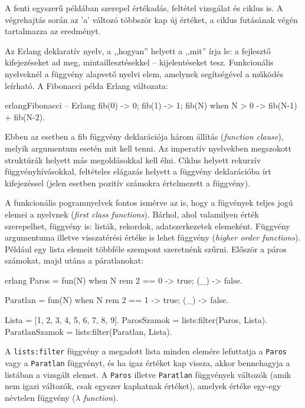 \documentclass[12pt, a4paper, oneside]{book}
\begin{document}
A fenti egyszerű példában szerepel értékadás, feltétel vizsgálat és ciklus is.
A végrehajtás során az 'a' változó többször kap új értéket, a ciklus futásának
végén tartalmazza az eredményt.

Az Erlang deklaratív nyelv, a ,,hogyan'' helyett a ,,mit'' írja le: a fejlesztő
kifejezéseket ad meg, mintaillesztésekkel -- kijelentéseket tesz. Funkcionális
nyelveknél a függvény alapvető nyelvi elem, amelynek segítségével a működés
leírható. A Fibonacci példa Erlang változata:

\begin{code}{erlang}{Fibonacci -- Erlang}
fib(0) -> 0; 
fib(1) -> 1; 
fib(N) when N > 0 -> fib(N-1) + fib(N-2).  
\end{code} 

Ebben az esetben a fib függvény deklarációja három állítás
(\emph{function clause}), melyik argumentum esetén mit kell tenni. Az imperatív
nyelvekben megszokott struktúrák helyett más megoldásokkal kell élni. Ciklus
helyett rekurzív függvényhívásokkal, feltételes elágazás helyett a függvény
deklarációba írt kifejezéssel (jelen esetben pozitív számokra értelmezett a
függvény).

A funkcionális pogramnyelvek fontos ismérve az is, hogy a fügvények teljes jogú
elemei a nyelvnek (\emph{first class functions}). Bárhol, ahol valamilyen érték
szerepelhet, függvény is: listák, rekordok, adatszerkezetek elemeként. Függvény
argumentuma illetve visszatérési értéke is lehet függvény (\emph{higher order
functions}). Például egy lista elemeit többféle szempont szeretnénk szűrni.
Először a páros számokat, majd utána a páratlanokat:

\begin{code}{erlang}{}
Paros = fun(N) when N rem 2 == 0 -> true;
           (_)                   -> false.

Paratlan = fun(N) when N rem 2 == 1 -> true;
              (_)                   -> false.


Lista = [1, 2, 3, 4, 5, 6, 7, 8, 9].
ParosSzamok = lists:filter(Paros, Lista).
ParatlanSzamok = lists:filter(Paratlan, Lista).
\end{code}

A \texttt{lists:filter} függvény a megadott lista minden elemére lefuttatja a
\texttt{Paros} vagy a \texttt{Paratlan} függvényt, és ha igaz értéket kap
vissza, akkor bennehagyja a listában a vizsgált elemet. A \texttt{Paros}
illetve \texttt{Paratlan} függvények változók (amik nem igazi változók, csak
egyszer kaphatnak értéket), amelyek értéke egy-egy névtelen függvény
(\emph{$\lambda$ function}).
\end{document}
